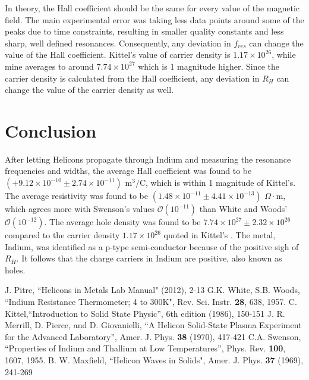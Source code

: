 In theory, the Hall coefficient should be the same for every value of the magnetic field. The main experimental error was taking less data points around some of the peaks due to time constraints, resulting in smaller quality constants and less sharp, well defined resonances. Consequently, any deviation in $f_{res}$ can change the value of the Hall coefficient. Kittel's value of carrier density is $1.17 \times 10^{26}$, while mine averages to around $7.74 \times 10^{27}$ which is 1 magnitude higher. Since the carrier density is calculated from the Hall coefficient, any deviation in $R_H$ can change the value of the carrier density as well.    

\section{Conclusion}

After letting Helicons propagate through Indium and measuring the resonance frequencies and widths, the average Hall coefficient was found to be $(+9.12 \times 10^{-10} \pm 2.74 \times 10^{-11})$ $\text{m}^3/\text{C}$, which is within 1 magnitude of Kittel's. The average resistivity was found to be $(1.48 \times 10^{-11} \pm 4.41 \times 10^{-13})$ $\Omega \cdot$m, which agrees more with Swenson's values $\mathcal{O}(10^{-11})$ than White and Woods' $\mathcal{O}(10^{-12})$. The average hole density was found to be $7.74 \times 10^{27} \pm 2.32 \times 10^{26}$ compared to the carrier density $1.17 \times 10^{26}$ quoted in Kittel's \cite{c3}.    
The metal, Indium, was identified as a p-type semi-conductor because of the positive sigh of $R_H$. It follows that the charge carriers in Indium are positive, also known as holes. 

\clearpage
\begin{thebibliography}{1} 
J. Pitre, ``Helicons in Metals Lab Manual" (2012), 2-13%
G.K. White, S.B. Woods, ``Indium Resistance Thermometer; 4 to 300K", Rev. Sci. Instr. {\bf 28}, 638, 1957. 
C. Kittel,``Introduction to Solid State Physic'', 6th edition (1986), 150-151
J. R. Merrill, D. Pierce, and D. Giovanielli, ``A Helicon Solid-State Plasma Experiment for the Advanced Laboratory'', Amer. J. Phys. {\bf 38} (1970), 417-421
C.A. Swenson, ``Properties of Indium and Thallium at Low Temperatures'', Phys. Rev. {\bf 100}, 1607, 1955.  
B. W. Maxfield, ``Helicon Waves in Solids", Amer. J. Phys. {\bf 37} (1969), 241-269 
\end{thebibliography}


